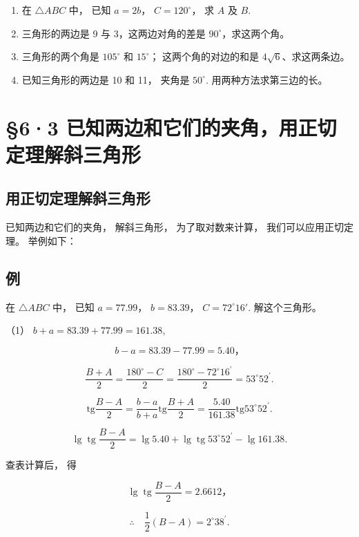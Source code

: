 \begin{enumerate}[start=2]
\item
  在 \(\triangle ABC\) 中， 已知 \(a = 2b\)， \(C = 120^\circ\)， 求
  \(A\) 及 \(B\).
\item
  三角形的两边是 9 与 3，这两边对角的差是 \(90^{\circ}\)，求这两个角。
\item
  三角形的两个角是 \(105^{\circ}\) 和 \(15^{\circ}\)；
  这两个角的对边的和是 \(4\sqrt{6}\)、求这两条边。
\item
  已知三角形的两边是 10 和 11， 夹角是 \(50^{\circ}\).
  用两种方法求第三边的长。
\end{enumerate}

\section{§6·3 已知两边和它们的夹角，用正切定理解斜三角形}

\subsection{用正切定理解斜三角形}

已知两边和它们的夹角， 解斜三角形， 为了取对数来计算，
我们可以应用正切定理。 举例如下：

\subsection{例}

在 \(\triangle ABC\) 中， 已知 \(a = 77.99\)， \(b = 83.39\)，
\(C = 72^{\circ}16'\). 解这个三角形。

 （1） \(b + a = 83.39 + 77.99 = 161.38,\)

\[
b - a = 83.39 - 77.99 = 5.40\text{，}
\]

\[
\frac {B + A}{2} = \frac {180 ^{\circ} - C}{2} = \frac {180 ^{\circ} - 72 ^{\circ} 16 ^{\prime}}{2} = 53 ^{\circ} 52 ^{\prime}.
\]

\[
\mathrm{tg} \frac {B - A}{2} = \frac {b - a}{b + a} \mathrm{tg} \frac {B + A}{2} = \frac {5.40}{161.38} \mathrm{tg} 53 ^{\circ} 52 ^{\prime}.
\]

\[
\lg \operatorname{tg} \frac {B - A}{2} = \lg 5.40 + \lg \operatorname{tg} 53 ^{\circ} 52 ^{\prime} - \lg 161.38.
\]

查表计算后， 得

\[
\lg \operatorname{tg} \frac {B - A}{2} = 2.6612\text{，}
\]

\[
\therefore \quad \frac {1}{2} (B - A) = 2 ^{\circ} 38 ^{\prime}.
\]

